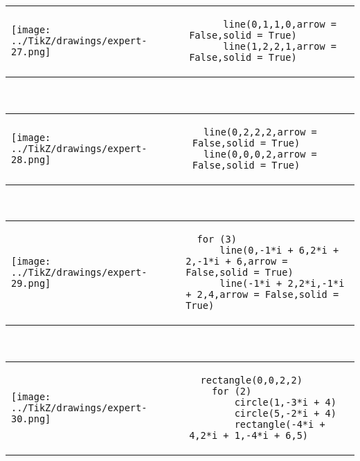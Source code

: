             \begin{tabular}{ll}
    \texttt{[image: ../TikZ/drawings/expert-27.png]}&
    
        \begin{minipage}{10cm}
        \begin{verbatim}
      line(0,1,1,0,arrow = False,solid = True)
      line(1,2,2,1,arrow = False,solid = True)
        \end{verbatim}
\end{minipage}

    \end{tabular}        
            \\

            \begin{tabular}{ll}
    \texttt{[image: ../TikZ/drawings/expert-28.png]}&
    
        \begin{minipage}{10cm}
        \begin{verbatim}
  line(0,2,2,2,arrow = False,solid = True)
  line(0,0,0,2,arrow = False,solid = True)
        \end{verbatim}
\end{minipage}

    \end{tabular}        
            \\

            \begin{tabular}{ll}
    \texttt{[image: ../TikZ/drawings/expert-29.png]}&
    
        \begin{minipage}{10cm}
        \begin{verbatim}
  for (3)
      line(0,-1*i + 6,2*i + 2,-1*i + 6,arrow = False,solid = True)
      line(-1*i + 2,2*i,-1*i + 2,4,arrow = False,solid = True)
        \end{verbatim}
\end{minipage}

    \end{tabular}        
            \\

            \begin{tabular}{ll}
    \texttt{[image: ../TikZ/drawings/expert-30.png]}&
    
        \begin{minipage}{10cm}
        \begin{verbatim}
  rectangle(0,0,2,2)
    for (2)
        circle(1,-3*i + 4)
        circle(5,-2*i + 4)
        rectangle(-4*i + 4,2*i + 1,-4*i + 6,5)
        \end{verbatim}
\end{minipage}

    \end{tabular}        
            \\

